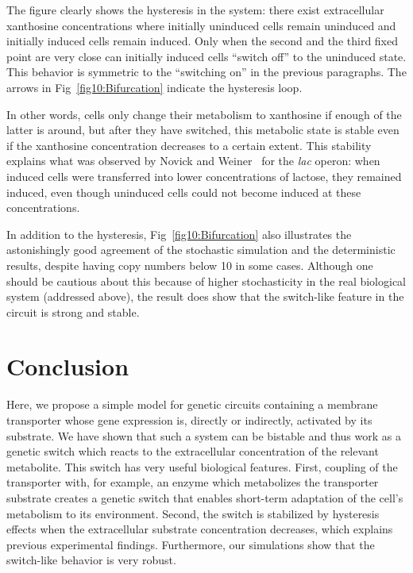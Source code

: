\documentclass[10pt,letterpaper]{article}
\begin{document}
	The figure clearly shows the hysteresis in the system: there exist extracellular xanthosine concentrations where
	initially uninduced cells remain uninduced and initially induced cells remain induced. Only when the second and the third fixed point are very close can initially induced cells ``switch off'' to the uninduced state. This
	behavior is symmetric to the ``switching on'' in the previous paragraphs. The arrows in Fig~\ref{fig10:Bifurcation} indicate the hysteresis loop.
	
	In other words, cells only change their metabolism to xanthosine if
	enough of the latter is around, but after they have switched, this metabolic
	state is stable even if the xanthosine concentration decreases to a certain
	extent. This stability explains what was observed by Novick and
	Weiner~\cite{Novick1957} for the \emph{lac} operon: when induced cells were
	transferred into lower concentrations of lactose, they remained induced,
	even though uninduced cells could not become induced at these
	concentrations.
	
	In addition to the hysteresis, Fig~\ref{fig10:Bifurcation} also illustrates the astonishingly good agreement of the stochastic simulation and the deterministic results, despite having copy numbers below 10 in some cases. Although one should be cautious about this because of higher stochasticity in the real biological system (addressed above), the result does show that the switch-like feature in the circuit is strong and stable.
	
	
	\section*{Conclusion}
	Here, we propose a simple model for genetic circuits containing
	a membrane transporter whose gene expression is, directly or indirectly,
	activated by its substrate. We have shown that such a system can be bistable
	and thus work as a genetic switch which reacts to the extracellular
	concentration of the relevant metabolite. This switch has very useful
	biological features. First, coupling of the transporter with, for example, an
	enzyme which metabolizes the transporter substrate creates a genetic switch that enables short-term
	adaptation of the cell's metabolism to its environment. Second, the switch
	is stabilized by hysteresis effects when the extracellular substrate
	concentration decreases, which explains previous experimental findings.
	Furthermore, our simulations show that the switch-like behavior is very robust. 
	
\end{document}
